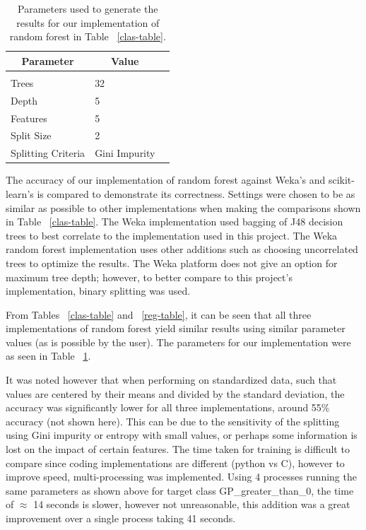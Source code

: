 \documentclass{article} %
\begin{document}
\begin{table}[h]
\caption{Parameters used to generate the results for our implementation of random forest in Table ~\ref{clas-table}.}
\label{params-table}
\begin{center}
\begin{tabular}{lll}
\multicolumn{1}{c}{\bf Parameter} &\multicolumn{1}{c}{\bf Value}
\\ \hline \\
Trees &32 \\
Depth &5 \\
Features &5 \\
Split Size &2 \\
Splitting Criteria &Gini Impurity
\end{tabular}
\end{center}
\end{table}

The accuracy of our implementation of random forest against Weka's and scikit-learn's is compared to demonstrate
its correctness.  Settings were chosen to be as similar as possible to other implementations when making the comparisons shown in Table ~\ref{clas-table}. The Weka implementation used bagging of J48 decision trees to best correlate to the implementation used in this project. The Weka random forest implementation uses other additions such as choosing uncorrelated trees to optimize the results. The Weka platform does not give an option for maximum tree depth; however, to better compare to this project's implementation, binary splitting was used.

From Tables ~\ref{clas-table} and ~\ref{reg-table}, it can be seen that all three implementations of random forest yield similar results using similar parameter values (as is possible by the user). The parameters for our implementation were as seen in Table ~\ref{params-table}.

It was noted however that when performing on standardized data, such that values are centered by their means and divided by the standard deviation, the accuracy was significantly lower for all three implementations, around 55\% accuracy (not shown here). This can be due to the sensitivity of the splitting using Gini impurity or entropy with small values, or perhaps some information is lost on the impact of certain features. The time taken for training is difficult to compare since coding implementations are different (python vs C), however to improve speed, multi-processing was implemented. Using 4 processes running the same parameters as shown above for target class GP\_greater\_than\_0, the time of $\approx$ 14 seconds is slower, however not unreasonable, this addition was a great improvement over a single process taking 41 seconds.
\end{document}
